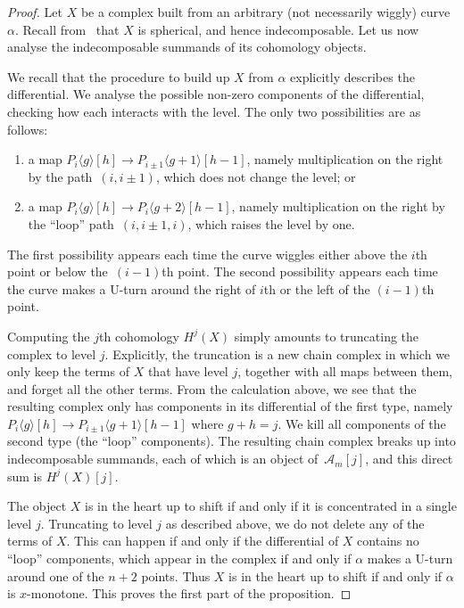\documentclass{amsart}
\theoremstyle{definition}
\begin{document}
\begin{proof}
  Let \(X\) be a complex built from an arbitrary (not necessarily wiggly) curve \(\alpha\).
  Recall from~\cite{kho.sei:02} that \(X\) is spherical, and hence indecomposable.
  Let us now analyse the indecomposable summands of its cohomology objects.
  
  We recall that the procedure to build up \(X\) from \(\alpha\) explicitly describes the differential.
  We analyse the possible non-zero components of the differential, checking how each interacts with the level.
  The only two possibilities are as follows:
  \begin{enumerate}
  \item a map \(P_i\langle g \rangle[h] \to P_{i\pm1}\langle g+1 \rangle[h-1]\), namely multiplication on the right by the path~\((i,i\pm1)\), which does not change the level; or
  \item a map \(P_i\langle g \rangle[h] \to P_{i}\langle g+2 \rangle[h-1]\), namely multiplication on the right by the ``loop'' path~\((i,i\pm1, i)\), which raises the level by one.
  \end{enumerate}
  The first possibility appears each time the curve wiggles either above the \(i\)th point or below the~\((i-1)\)th point.
  The second possibility appears each time the curve makes a U-turn around the right of \(i\)th or the left of the \((i-1)\)th point.

  Computing the \(j\)th cohomology \(H^j(X)\) simply amounts to truncating the complex to level \(j\).
  Explicitly, the truncation is a new chain complex in which we only keep the terms of \(X\) that have level \(j\), together with all maps between them, and forget all the other terms.
  From the calculation above, we see that the resulting complex only has components in its differential of the first type, namely \(P_i\langle g \rangle[h] \to P_{i\pm1}\langle g+1 \rangle[h-1]\) where \(g + h = j\).
  We kill all components of the second type (the ``loop'' components).
  The resulting chain complex breaks up into indecomposable summands, each of which is an object of~\(\mathcal{A}_m[j]\), and this direct sum is \(H^j(X)[j]\).
  
  The object \(X\) is in the heart up to shift if and only if it is concentrated in a single level \(j\).
  Truncating to level \(j\) as described above, we do not delete any of the terms of \(X\).
  This can happen if and only if the differential of \(X\) contains no ``loop'' components,
  which appear in the complex if and only if \(\alpha\) makes a U-turn around one of the \(n+2\) points.
  Thus \(X\) is in the heart up to shift if and only if \(\alpha\) is  \(x\)-monotone.
  This proves the first part of the proposition.


\end{proof}
\end{document}
